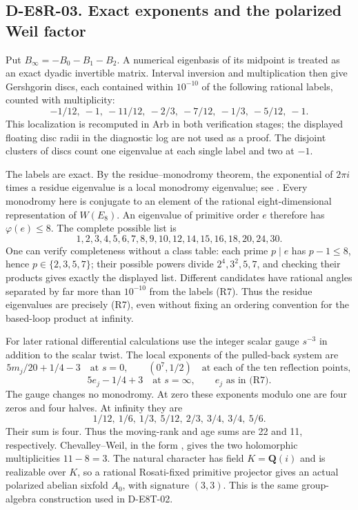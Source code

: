 \subsection*{D-E8R-03. Exact exponents and the polarized Weil factor}
Put $B_\infty=-B_0-B_1-B_2$. A numerical eigenbasis of its midpoint
is treated as an exact dyadic invertible matrix. Interval inversion
and multiplication then give Gershgorin discs, each contained within
$10^{-10}$ of the following rational labels, counted with
multiplicity:
\[
-1/12,\ -1,\ -11/12,\ -2/3,\ -7/12,\ -1/3,\ -5/12,\ -1.
\tag{R7}
\]
This localization is recomputed in Arb in both verification stages;
the displayed floating disc radii in the diagnostic log are not used
as a proof. The disjoint clusters of discs count one eigenvalue at
each single label and two at $-1$.

The labels are exact. By the residue--monodromy theorem, the
exponential of $2\pi i$ times a residue eigenvalue is a local
monodromy eigenvalue; see \cite[Corollary 16.20, author extract
p.~274]{IM:IlyashenkoYakovenko}. Every monodromy here is conjugate
to an element of the rational eight-dimensional representation of
$W(E_8)$. An eigenvalue of primitive order $e$ therefore has
$\varphi(e)\le8$. The complete possible list is
\[
1,2,3,4,5,6,7,8,9,10,12,14,15,16,18,20,24,30.
\]
One can verify completeness without a class table: each prime
$p\mid e$ has $p-1\le8$, hence $p\in\{2,3,5,7\}$; their possible
powers divide $2^4,3^2,5,7$, and checking their products gives exactly
the displayed list. Different candidates have rational angles
separated by far more than $10^{-10}$ from the labels (R7).
Thus the residue eigenvalues are precisely (R7), even without
fixing an ordering convention for the based-loop product at infinity.

For later rational differential calculations use the integer scalar
gauge $s^{-3}$ in addition to the scalar twist. The local exponents
of the pulled-back system are
\[
5m_j/20+1/4-3\quad\text{at }s=0,
\qquad (0^7,1/2)\quad\text{at each of the ten reflection points},
\]
\[
5e_j-1/4+3\quad\text{at }s=\infty,
\qquad e_j\text{ as in (R7)}.
\tag{R8}
\]
The gauge changes no monodromy. At zero these exponents modulo one
are four zeros and four halves. At infinity they are
\[
1/12,\ 1/6,\ 1/3,\ 5/12,\ 2/3,\ 3/4,\ 3/4,\ 5/6.
\]
Their sum is four. Thus the moving-rank and age sums are 22 and 11,
respectively. Chevalley--Weil, in the form
\cite[Theorem 2.10, author manuscript p.~8]{IM:FredianiGhigiPenegini},
gives the two holomorphic multiplicities $11-8=3$.
The natural character has field $K=\mathbf Q(i)$ and is realizable
over $K$, so a rational Rosati-fixed primitive projector gives an
actual polarized abelian sixfold $A_0$, with signature $(3,3)$.
This is the same group-algebra construction used in D-E8T-02.

